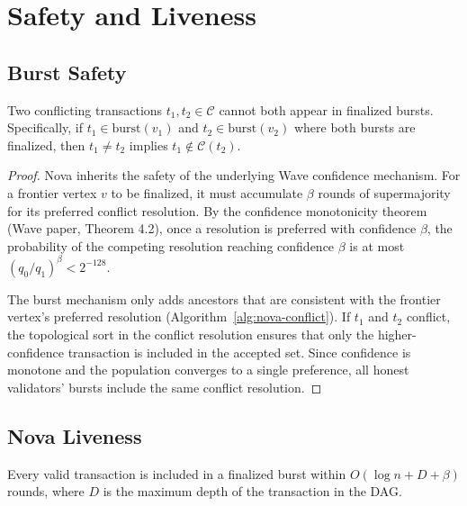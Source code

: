 \section{Safety and Liveness}

\label{sec:safety}

\subsection{Burst Safety}

\begin{theorem}
\label{thm:nova-safety}
Two conflicting transactions $t_1, t_2 \in \mathcal{C}$ cannot both appear in
finalized bursts. Specifically, if $t_1 \in \text{burst}(v_1)$ and
$t_2 \in \text{burst}(v_2)$ where both bursts are finalized, then $t_1 \neq t_2$
implies $t_1 \notin \mathcal{C}(t_2)$.
\end{theorem}

\begin{proof}
Nova inherits the safety of the underlying Wave confidence mechanism. For a frontier
vertex $v$ to be finalized, it must accumulate $\beta$ rounds of supermajority for
its preferred conflict resolution. By the confidence monotonicity theorem (Wave paper,
Theorem 4.2), once a resolution is preferred with confidence $\beta$, the probability
of the competing resolution reaching confidence $\beta$ is at most $(q_0/q_1)^\beta < 2^{-128}$.

The burst mechanism only adds ancestors that are consistent with the frontier vertex's
preferred resolution (Algorithm~\ref{alg:nova-conflict}). If $t_1$ and $t_2$ conflict,
the topological sort in the conflict resolution ensures that only the higher-confidence
transaction is included in the accepted set. Since confidence is monotone and the
population converges to a single preference, all honest validators' bursts include
the same conflict resolution.
\end{proof}

\subsection{Nova Liveness}

\begin{lemma}
\label{lem:nova-liveness}
Every valid transaction is included in a finalized burst within $O(\log n + D + \beta)$
rounds, where $D$ is the maximum depth of the transaction in the DAG.
\end{lemma}

